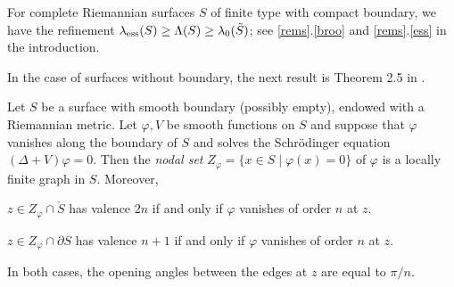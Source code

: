 \begin{rem}
For complete Riemannian surfaces $S$ of finite type with compact boundary,
we have the refinement $\lambda_{\rm ess}(S)\ge\Lambda(S)\ge\lambda_0(\tilde S)$;
see \cref{rems}.\ref{broo} and \ref{rems}.\ref{ess} in the introduction.
\end{rem}

In the case of surfaces without boundary,
the next result is Theorem 2.5 in \cite{Che}.

\begin{thm}\label{cheng}
Let $S$ be a surface with smooth boundary (possibly empty),
endowed with a Riemannian metric.
Let ${\varphi},V$ be smooth functions on $S$
and suppose that ${\varphi}$ vanishes along the boundary of $S$
and solves the Schr\"odinger equation $(\Delta+V){\varphi}=0$.
Then the \emph{nodal set} $Z_{\varphi}=\{x\in S\mid {\varphi}(x)=0\}$
of ${\varphi}$ is a locally finite graph in $S$.
Moreover,
\begin{compactenum}[1)]
\item
$z\in Z_{\varphi}\cap\mathring S$ has valence $2n$
if and only if ${\varphi}$ vanishes of order $n$ at $z$.
\item
$z\in Z_{\varphi}\cap\partial S$ has valence $n+1$
if and only if ${\varphi}$ vanishes of order $n$ at $z$.
\end{compactenum}
In both cases, the opening angles between the edges at $z$ are equal to $\pi/n$.
\end{thm}

